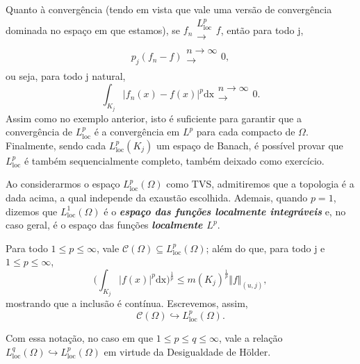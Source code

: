 \documentclass[../distribution_theory_notes.tex]{subfiles}
\begin{document}
\begin{example}
	Quanto à convergência (tendo em vista que vale uma versão de convergência dominada no espaço em que estamos), se \(f_{n}\substack{L_{\mathrm{loc}}^{p} \\ \rightarrow \\ }f\), então para todo j,
	\[
		p_{j}(f_{n}-f)\substack{n\to \infty \\ \rightarrow \\ }0,
	\]
	ou seja, para todo j natural,
	\[
		\int_{K_{j}}^{}|f_{n}(x)-f(x)|^{p} \mathrm{dx}\substack{n\to \infty \\ \rightarrow \\ }0.
	\]
	Assim como no exemplo anterior, isto é suficiente para garantir que a convergência de \(L_{\mathrm{loc}}^{p}\) é a convergência em \(L^{p}\) para cada compacto de \(\Omega \). Finalmente, sendo cada \(L_{\mathrm{loc}}^{p}(K_{j})\) um espaço de Banach, é possível provar que \(L_{\mathrm{loc}}^{p}\) é também sequencialmente completo, também deixado como exercício.
\end{example}
\begin{tcolorbox}[
		skin=enhanced,
		title=Observação,
		fonttitle=\bfseries,
		colframe=black,
		colbacktitle=cyan!75!white,
		colback=cyan!15,
		colbacklower=black,
		coltitle=black,
		drop fuzzy shadow,
	]
	Ao considerarmos o espaço \(L_{\mathrm{loc}}^{p}(\Omega )\) como TVS, admitiremos que a topologia é a dada acima, a qual independe da exaustão escolhida. Ademais, quando \(p=1\), dizemos que \(L_{\mathrm{loc}}^{1}(\Omega )\) é o \textbf{\textit{espaço das funções localmente integráveis}} e, no caso geral, é o espaço das funções \textbf{\textit{localmente \(L^{p}\)}}.
\end{tcolorbox}
\begin{tcolorbox}[
		skin=enhanced,
		title=Observação,
		fonttitle=\bfseries,
		colframe=black,
		colbacktitle=cyan!75!white,
		colback=cyan!15,
		colbacklower=black,
		coltitle=black,
		drop fuzzy shadow,
	]
	Para todo \(1\leq p\leq \infty\), vale \(\mathcal{C}(\Omega )\subseteq L_{\mathrm{loc}}^{p}(\Omega )\); além do que, para todo j e \(1\leq p\leq \infty\),
	\[
		\biggl(\int_{K_{j}}^{}|f(x)|^{p} \mathrm{dx}\biggr)^{\frac{1}{p}}\leq m(K_{j})^{\frac{1}{p}}\Vert f \Vert_{(u, j)},
	\]
	mostrando que a inclusão é contínua. Escrevemos, assim,
	\[
		\mathcal{C}(\Omega )\hookrightarrow L_{\mathrm{loc}}^{p}(\Omega ).
	\]

	Com essa notação, no caso em que \(1\leq p\leq q\leq \infty\), vale a relação \(L_{\mathrm{loc}}^{q}(\Omega )\hookrightarrow L_{\mathrm{loc}}^{p}(\Omega )\) em virtude da Desigualdade de Hölder.
\end{tcolorbox}
\end{document}
